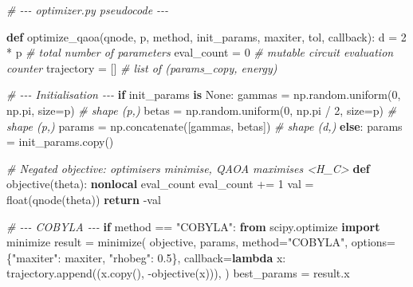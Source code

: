 \documentclass[
  11pt,
]{report}
\newenvironment{Shaded}{}{}
\newcommand{\BuiltInTok}[1]{\textcolor[rgb]{0.00,0.50,0.00}{#1}}
\newcommand{\CommentTok}[1]{\textcolor[rgb]{0.38,0.63,0.69}{\textit{#1}}}
\newcommand{\ControlFlowTok}[1]{\textcolor[rgb]{0.00,0.44,0.13}{\textbf{#1}}}
\newcommand{\DecValTok}[1]{\textcolor[rgb]{0.25,0.63,0.44}{#1}}
\newcommand{\FloatTok}[1]{\textcolor[rgb]{0.25,0.63,0.44}{#1}}
\newcommand{\ImportTok}[1]{\textcolor[rgb]{0.00,0.50,0.00}{\textbf{#1}}}
\newcommand{\KeywordTok}[1]{\textcolor[rgb]{0.00,0.44,0.13}{\textbf{#1}}}
\newcommand{\NormalTok}[1]{#1}
\newcommand{\OperatorTok}[1]{\textcolor[rgb]{0.40,0.40,0.40}{#1}}
\newcommand{\StringTok}[1]{\textcolor[rgb]{0.25,0.44,0.63}{#1}}
\newcommand{\VariableTok}[1]{\textcolor[rgb]{0.10,0.09,0.49}{#1}}
\begin{document}
\begin{Shaded}
\begin{Highlighting}[]
\CommentTok{\# {-}{-}{-} optimizer.py pseudocode {-}{-}{-}}

\KeywordTok{def}\NormalTok{ optimize\_qaoa(qnode, p, method, init\_params, maxiter, tol, callback):}
\NormalTok{    d }\OperatorTok{=} \DecValTok{2} \OperatorTok{*}\NormalTok{ p                         }\CommentTok{\# total number of parameters}
\NormalTok{    eval\_count }\OperatorTok{=} \DecValTok{0}                    \CommentTok{\# mutable circuit evaluation counter}
\NormalTok{    trajectory }\OperatorTok{=}\NormalTok{ []                   }\CommentTok{\# list of (params\_copy, energy)}

    \CommentTok{\# {-}{-}{-} Initialisation {-}{-}{-}}
    \ControlFlowTok{if}\NormalTok{ init\_params }\KeywordTok{is} \VariableTok{None}\NormalTok{:}
\NormalTok{        gammas }\OperatorTok{=}\NormalTok{ np.random.uniform(}\DecValTok{0}\NormalTok{, np.pi, size}\OperatorTok{=}\NormalTok{p)       }\CommentTok{\# shape (p,)}
\NormalTok{        betas }\OperatorTok{=}\NormalTok{ np.random.uniform(}\DecValTok{0}\NormalTok{, np.pi }\OperatorTok{/} \DecValTok{2}\NormalTok{, size}\OperatorTok{=}\NormalTok{p)    }\CommentTok{\# shape (p,)}
\NormalTok{        params }\OperatorTok{=}\NormalTok{ np.concatenate([gammas, betas])            }\CommentTok{\# shape (d,)}
    \ControlFlowTok{else}\NormalTok{:}
\NormalTok{        params }\OperatorTok{=}\NormalTok{ init\_params.copy()}

    \CommentTok{\# Negated objective: optimisers minimise, QAOA maximises \textless{}H\_C\textgreater{}}
    \KeywordTok{def}\NormalTok{ objective(theta):}
        \KeywordTok{nonlocal}\NormalTok{ eval\_count}
\NormalTok{        eval\_count }\OperatorTok{+=} \DecValTok{1}
\NormalTok{        val }\OperatorTok{=} \BuiltInTok{float}\NormalTok{(qnode(theta))}
        \ControlFlowTok{return} \OperatorTok{{-}}\NormalTok{val}

    \CommentTok{\# {-}{-}{-} COBYLA {-}{-}{-}}
    \ControlFlowTok{if}\NormalTok{ method }\OperatorTok{==} \StringTok{"COBYLA"}\NormalTok{:}
        \ImportTok{from}\NormalTok{ scipy.optimize }\ImportTok{import}\NormalTok{ minimize}
\NormalTok{        result }\OperatorTok{=}\NormalTok{ minimize(}
\NormalTok{            objective, params, method}\OperatorTok{=}\StringTok{"COBYLA"}\NormalTok{,}
\NormalTok{            options}\OperatorTok{=}\NormalTok{\{}\StringTok{"maxiter"}\NormalTok{: maxiter, }\StringTok{"rhobeg"}\NormalTok{: }\FloatTok{0.5}\NormalTok{\},}
\NormalTok{            callback}\OperatorTok{=}\KeywordTok{lambda}\NormalTok{ x: trajectory.append((x.copy(), }\OperatorTok{{-}}\NormalTok{objective(x))),}
\NormalTok{        )}
\NormalTok{        best\_params }\OperatorTok{=}\NormalTok{ result.x}


\end{Highlighting}
\end{Shaded}
\end{document}

